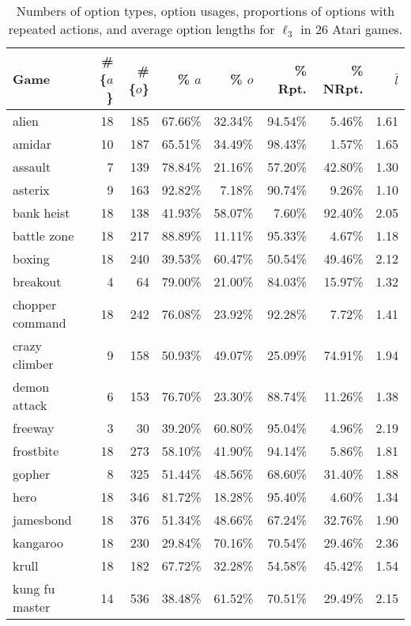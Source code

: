 \begin{table}[h!]
\caption{Numbers of option types, option usages, proportions of options with repeated actions, and average option lengths for $\ell_3$ in 26 Atari games.}
\centering
\small
\begin{tabular}{l|rrrrrrr}
    \toprule
    Game & \# \{$a$\} & \# \{$o$\} & \% $a$ & \% $o$ & \% Rpt. & \% NRpt. & $\bar{l}$ \\
    \midrule
    alien & 18 & 185 & 67.66\% & 32.34\% & 94.54\% & 5.46\% & 1.61 \\
    amidar & 10 & 187 & 65.51\% & 34.49\% & 98.43\% & 1.57\% & 1.65 \\
    assault & 7 & 139 & 78.84\% & 21.16\% & 57.20\% & 42.80\% & 1.30 \\
    asterix & 9 & 163 & 92.82\% & 7.18\% & 90.74\% & 9.26\% & 1.10 \\
    bank heist & 18 & 138 & 41.93\% & 58.07\% & 7.60\% & 92.40\% & 2.05 \\
    battle zone & 18 & 217 & 88.89\% & 11.11\% & 95.33\% & 4.67\% & 1.18 \\
    boxing & 18 & 240 & 39.53\% & 60.47\% & 50.54\% & 49.46\% & 2.12 \\
    breakout & 4 & 64 & 79.00\% & 21.00\% & 84.03\% & 15.97\% & 1.32 \\
    chopper command & 18 & 242 & 76.08\% & 23.92\% & 92.28\% & 7.72\% & 1.41 \\
    crazy climber & 9 & 158 & 50.93\% & 49.07\% & 25.09\% & 74.91\% & 1.94 \\
    demon attack & 6 & 153 & 76.70\% & 23.30\% & 88.74\% & 11.26\% & 1.38 \\
    freeway & 3 & 30 & 39.20\% & 60.80\% & 95.04\% & 4.96\% & 2.19 \\
    frostbite & 18 & 273 & 58.10\% & 41.90\% & 94.14\% & 5.86\% & 1.81 \\
    gopher & 8 & 325 & 51.44\% & 48.56\% & 68.60\% & 31.40\% & 1.88 \\
    hero & 18 & 346 & 81.72\% & 18.28\% & 95.40\% & 4.60\% & 1.34 \\
    jamesbond & 18 & 376 & 51.34\% & 48.66\% & 67.24\% & 32.76\% & 1.90 \\
    kangaroo & 18 & 230 & 29.84\% & 70.16\% & 70.54\% & 29.46\% & 2.36 \\
    krull & 18 & 182 & 67.72\% & 32.28\% & 54.58\% & 45.42\% & 1.54 \\
    kung fu master & 14 & 536 & 38.48\% & 61.52\% & 70.51\% & 29.49\% & 2.15 \\

\end{tabular}
\end{table}
